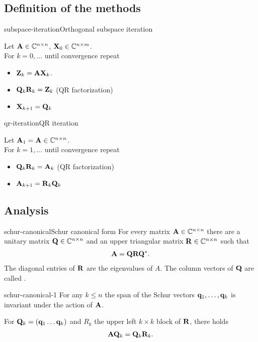 \subsection{Definition of the methods}

\begin{Algorithm*}{subspace-iteration}{Orthogonal subspace iteration}

  Let $\mathbf A\in\mathbb C^{n\times n}$, $\mathbf X_0 \in \mathbb C^{n\times m}$.\\
  For $k=0,\ldots$ until convergence repeat
  \begin{itemize}
  \item $\mathbf Z_k = \mathbf A \mathbf X_k$.
  \item $\mathbf Q_k\mathbf R_k = \mathbf Z_k$ (QR factorization)
  \item $\mathbf X_{k+1} = \mathbf Q_k$
  \end{itemize}
\end{Algorithm*}

\begin{Algorithm*}{qr-iteration}{QR iteration}
  
  Let $\mathbf A_1 = \mathbf A\in\mathbb C^{n\times n}$.\\
  For $k=1,\ldots$ until convergence repeat
  \begin{itemize}
  \item $\mathbf Q_k\mathbf R_k = \mathbf A_k$ (QR factorization)
  \item $\mathbf A_{k+1} = \mathbf R_k\mathbf Q_k$
  \end{itemize}
\end{Algorithm*}

\subsection{Analysis}
\begin{Theorem*}{schur-canonical}{Schur canonical form}
  For every matrix $\mathbf A\in\mathbb C^{n\times n}$ there are a unitary matrix
  $\mathbf Q\in\mathbb C^{n\times n}$ and an upper triangular matrix $\mathbf R\in\mathbb C^{n\times n}$ such
  that
  \begin{gather}
    \mathbf A = \mathbf Q \mathbf R \mathbf Q^*.
  \end{gather}
  The diagonal entries of $\mathbf R$ are the eigenvalues of $A$. The
  column vectors of $\mathbf Q$ are called .
\end{Theorem*}

\begin{Lemma}{schur-canonical-1}
  For any $k\le n$ the span of the Schur vectors
  $\mathbf q_1,\dots,\mathbf q_k$ is invariant under the action of $\mathbf A$.

  For $\mathbf Q_k = (\mathbf q_1\dots\mathbf q_k)$ and $R_k$ the upper left $k\times k$ block of $\mathbf R$, there holds
  \begin{gather}
    \mathbf A\mathbf Q_k = \mathbf Q_k \mathbf R_k.
  \end{gather}
\end{Lemma}

